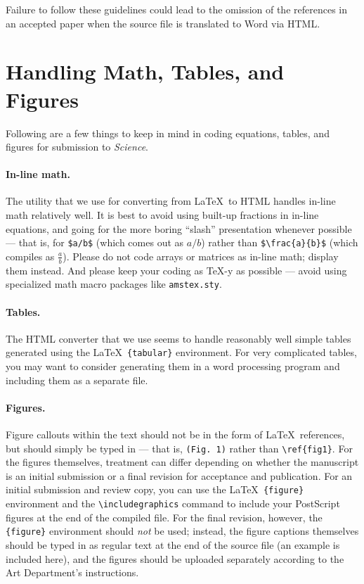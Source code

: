 \documentclass[12pt]{article}
\begin{document}
\noindent Failure to follow these guidelines could lead
to the omission of the references in an accepted paper when the source
file is translated to Word via HTML.



\section*{Handling Math, Tables, and Figures}

Following are a few things to keep in mind in coding equations,
tables, and figures for submission to {\it Science}.

\paragraph*{In-line math.}  The utility that we use for converting
from \LaTeX\ to HTML handles in-line math relatively well.  It is best
to avoid using built-up fractions in in-line equations, and going for
the more boring ``slash'' presentation whenever possible --- that is,
for \verb+$a/b$+ (which comes out as $a/b$) rather than
\verb+$\frac{a}{b}$+ (which compiles as $\frac{a}{b}$).  
 Please do not code arrays or matrices as
in-line math; display them instead.  And please keep your coding as
\TeX-y as possible --- avoid using specialized math macro packages
like \texttt{amstex.sty}.

\paragraph*{Tables.}  The HTML converter that we use seems to handle
reasonably well simple tables generated using the \LaTeX\
\texttt{\{tabular\}} environment.  For very complicated tables, you
may want to consider generating them in a word processing program and
including them as a separate file.

\paragraph*{Figures.}  Figure callouts within the text should not be
in the form of \LaTeX\ references, but should simply be typed in ---
that is, \verb+(Fig. 1)+ rather than \verb+\ref{fig1}+.  For the
figures themselves, treatment can differ depending on whether the
manuscript is an initial submission or a final revision for acceptance
and publication.  For an initial submission and review copy, you can
use the \LaTeX\ \verb+{figure}+ environment and the
\verb+\includegraphics+ command to include your PostScript figures at
the end of the compiled file.  For the final revision,
however, the \verb+{figure}+ environment should {\it not\/} be used;
instead, the figure captions themselves should be typed in as regular
text at the end of the source file (an example is included here), and
the figures should be uploaded separately according to the Art
Department's instructions.
\end{document}
